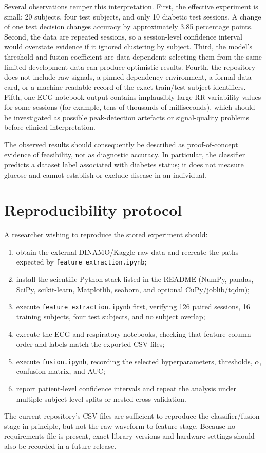 \documentclass[11pt,a4paper]{article}
\begin{document}
Several observations temper this interpretation. First, the effective experiment is small: 20 subjects, four test subjects, and only 10 diabetic test sessions. A change of one test decision changes accuracy by approximately 3.85 percentage points. Second, the data are repeated sessions, so a session-level confidence interval would overstate evidence if it ignored clustering by subject. Third, the model's threshold and fusion coefficient are data-dependent; selecting them from the same limited development data can produce optimistic results. Fourth, the repository does not include raw signals, a pinned dependency environment, a formal data card, or a machine-readable record of the exact train/test subject identifiers. Fifth, one ECG notebook output contains implausibly large RR-variability values for some sessions (for example, tens of thousands of milliseconds), which should be investigated as possible peak-detection artefacts or signal-quality problems before clinical interpretation.

The observed results should consequently be described as proof-of-concept evidence of feasibility, not as diagnostic accuracy. In particular, the classifier predicts a dataset label associated with diabetes status; it does not measure glucose and cannot establish or exclude disease in an individual.

\section{Reproducibility protocol}
A researcher wishing to reproduce the stored experiment should:
\begin{enumerate}
  \item obtain the external DINAMO/Kaggle raw data and recreate the paths expected by \texttt{feature extraction.ipynb};
  \item install the scientific Python stack listed in the README (NumPy, pandas, SciPy, scikit-learn, Matplotlib, seaborn, and optional CuPy/joblib/tqdm);
  \item execute \texttt{feature extraction.ipynb} first, verifying 126 paired sessions, 16 training subjects, four test subjects, and no subject overlap;
  \item execute the ECG and respiratory notebooks, checking that feature column order and labels match the exported CSV files;
  \item execute \texttt{fusion.ipynb}, recording the selected hyperparameters, thresholds, $\alpha$, confusion matrix, and AUC;
  \item report patient-level confidence intervals and repeat the analysis under multiple subject-level splits or nested cross-validation.
\end{enumerate}
The current repository's CSV files are sufficient to reproduce the classifier/fusion stage in principle, but not the raw waveform-to-feature stage. Because no requirements file is present, exact library versions and hardware settings should also be recorded in a future release.
\end{document}
